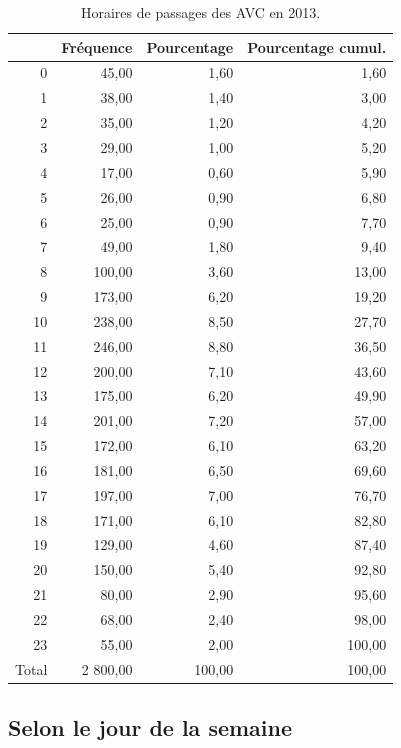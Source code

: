 \documentclass[12pt,english,french,twoside]{book}\usepackage[]{graphicx}\usepackage[]{color}
\begin{document}
\begin{table}[ht]
\centering
\begin{tabular}{rrrr}
  \hline
 & Fréquence & Pourcentage & Pourcentage cumul. \\ 
  \hline
0 & 45,00 & 1,60 & 1,60 \\ 
  1 & 38,00 & 1,40 & 3,00 \\ 
  2 & 35,00 & 1,20 & 4,20 \\ 
  3 & 29,00 & 1,00 & 5,20 \\ 
  4 & 17,00 & 0,60 & 5,90 \\ 
  5 & 26,00 & 0,90 & 6,80 \\ 
  6 & 25,00 & 0,90 & 7,70 \\ 
  7 & 49,00 & 1,80 & 9,40 \\ 
  8 & 100,00 & 3,60 & 13,00 \\ 
  9 & 173,00 & 6,20 & 19,20 \\ 
  10 & 238,00 & 8,50 & 27,70 \\ 
  11 & 246,00 & 8,80 & 36,50 \\ 
  12 & 200,00 & 7,10 & 43,60 \\ 
  13 & 175,00 & 6,20 & 49,90 \\ 
  14 & 201,00 & 7,20 & 57,00 \\ 
  15 & 172,00 & 6,10 & 63,20 \\ 
  16 & 181,00 & 6,50 & 69,60 \\ 
  17 & 197,00 & 7,00 & 76,70 \\ 
  18 & 171,00 & 6,10 & 82,80 \\ 
  19 & 129,00 & 4,60 & 87,40 \\ 
  20 & 150,00 & 5,40 & 92,80 \\ 
  21 & 80,00 & 2,90 & 95,60 \\ 
  22 & 68,00 & 2,40 & 98,00 \\ 
  23 & 55,00 & 2,00 & 100,00 \\ 
    Total & 2 800,00 & 100,00 & 100,00 \\ 
   \hline
\end{tabular}
\caption[Horaire de passage des AVC]{Horaires de passages des AVC en 2013.} 
\label{fig:passage_avc}
\end{table}



\subsection*{Selon le jour de la semaine}
\end{document}

